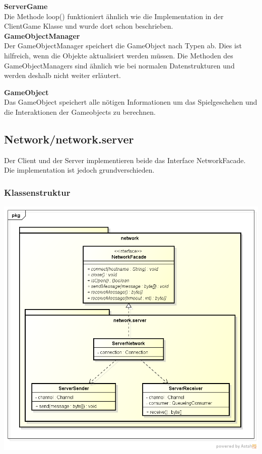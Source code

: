 \documentclass[11pt]{scrartcl}
\begin{document}
\textbf{ServerGame}\\
Die Methode loop() funktioniert ähnlich wie die Implementation in der ClientGame Klasse und wurde dort schon beschrieben.\\

\textbf{GameObjectManager}\\
Der GameObjectManager speichert die GameObject nach Typen ab. Dies ist hilfreich, wenn die Objekte aktualisiert werden müssen. Die Methoden des GameObjectManagers sind ähnlich wie bei normalen Datenstrukturen und werden deshalb nicht weiter erläutert.\\

\newpage

\textbf{GameObject}\\
Das GameObject speichert alle nötigen Informationen um das Spielgeschehen und die Interaktionen der Gameobjects zu berechnen.\\

\newpage

\subsection{Network/network.server}

Der Client und der Server implementieren beide das Interface NetworkFacade. Die implementation ist jedoch grundverschieden.

\subsubsection{Klassenstruktur}
\includegraphics[scale=0.5]{ClassDiagramNetworkServer}
\end{document}
